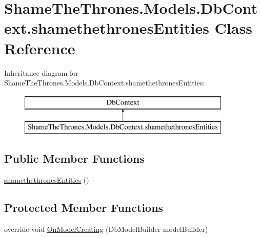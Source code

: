 \hypertarget{class_shame_the_thrones_1_1_models_1_1_db_context_1_1shamethethrones_entities}{}\section{Shame\+The\+Thrones.\+Models.\+Db\+Context.\+shamethethrones\+Entities Class Reference}
\label{class_shame_the_thrones_1_1_models_1_1_db_context_1_1shamethethrones_entities}
Inheritance diagram for Shame\+The\+Thrones.\+Models.\+Db\+Context.\+shamethethrones\+Entities\+:\begin{figure}[H]
\begin{center}
\leavevmode
\includegraphics[height=2.000000cm]{dd/dbe/class_shame_the_thrones_1_1_models_1_1_db_context_1_1shamethethrones_entities}
\end{center}
\end{figure}
\subsection*{Public Member Functions}
\begin{DoxyCompactItemize}
\item 
\hyperlink{class_shame_the_thrones_1_1_models_1_1_db_context_1_1shamethethrones_entities_a113cde676bf075a873eea898af74faf1}{shamethethrones\+Entities} ()
\end{DoxyCompactItemize}
\subsection*{Protected Member Functions}
\begin{DoxyCompactItemize}
\item 
override void \hyperlink{class_shame_the_thrones_1_1_models_1_1_db_context_1_1shamethethrones_entities_a6e0c8d4902a5b6ccf682674c7bfc3c69}{On\+Model\+Creating} (Db\+Model\+Builder model\+Builder)
\end{DoxyCompactItemize}
